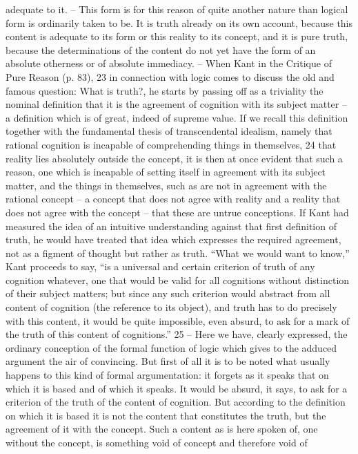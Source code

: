 adequate to it. – This form is for this reason of quite another nature than
logical form is ordinarily taken to be. It is truth already on its own account,
because this content is adequate to its form or this reality to its concept,
and it is pure truth, because the determinations of the content do not yet
have the form of an absolute otherness or of absolute immediacy. – When
Kant in the Critique of Pure Reason (p. 83), 23 in connection with logic
comes to discuss the old and famous question: What is truth?, he starts by
passing off as a triviality the nominal definition that it is the agreement of
cognition with its subject matter – a definition which is of great, indeed of
supreme value. If we recall this definition together with the fundamental
thesis of transcendental idealism, namely that rational cognition is incapable
of comprehending things in themselves, 24 that reality lies absolutely outside
the concept, it is then at once evident that such a reason, one which is
incapable of setting itself in agreement with its subject matter, and the things
in themselves, such as are not in agreement with the rational concept – a
concept that does not agree with reality and a reality that does not agree
with the concept – that these are untrue conceptions. If Kant had measured
the idea of an intuitive understanding against that first definition of truth,
he would have treated that idea which expresses the required agreement,
not as a figment of thought but rather as truth.
“What we would want to know,” Kant proceeds to say, “is a universal
and certain criterion of truth of any cognition whatever, one that would be
valid for all cognitions without distinction of their subject matters; but since
any such criterion would abstract from all content of cognition (the reference
to its object), and truth has to do precisely with this content, it would be quite
impossible, even absurd, to ask for a mark of the truth of this content of
cognitions.” 25 – Here we have, clearly expressed, the ordinary conception
of the formal function of logic which gives to the adduced argument the air
of convincing. But first of all it is to be noted what usually happens to this
kind of formal argumentation: it forgets as it speaks that on which it is based
and of which it speaks. It would be absurd, it says, to ask for a criterion
of the truth of the content of cognition. But according to the definition on
which it is based it is not the content that constitutes the truth, but the
agreement of it with the concept. Such a content as is here spoken of, one
without the concept, is something void of concept and therefore void of
